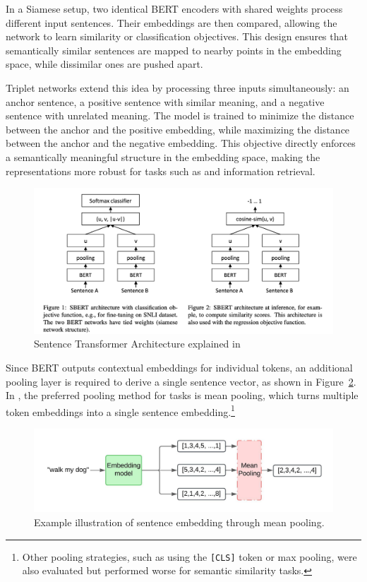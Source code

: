 In a Siamese setup, two identical BERT encoders with shared weights process different input sentences. Their embeddings are then compared, allowing the network to learn similarity or classification objectives. This design ensures that semantically similar sentences are mapped to nearby points in the embedding space, while dissimilar ones are pushed apart.

Triplet networks extend this idea by processing three inputs simultaneously: an anchor sentence, a positive sentence with similar meaning, and a negative sentence with unrelated meaning. The model is trained to minimize the distance between the anchor and the positive embedding, while maximizing the distance between the anchor and the negative embedding. This objective directly enforces a semantically meaningful structure in the embedding space, making the representations more robust for tasks such as  and information retrieval.
\begin{figure}[h!]
    \centering
    \includegraphics[width=1\linewidth]{Images/sentence_transformer.png}
    \caption{Sentence Transformer Architecture explained in\cite{reimers2019sentencebertsentenceembeddingsusing}}
    \label{fig:placeholder}
\end{figure}
Since BERT outputs contextual embeddings for individual tokens, an additional pooling layer is required to derive a single sentence vector, as shown in Figure~\ref{fig:Sentence_embedding}. In \cite{reimers2019sentencebertsentenceembeddingsusing}, the preferred pooling method for  tasks is mean pooling, which turns multiple token embeddings into a single sentence embedding.\footnote{Other pooling strategies, such as using the \texttt{[CLS]} token or max pooling, were also evaluated but performed worse for semantic similarity tasks.}

\begin{figure}[h!]
    \centering
    \includegraphics[width=1\linewidth]{Figures/Sentence_Embedding.jpeg}
    \caption{Example illustration of sentence embedding through mean pooling.}
    \label{fig:Sentence_embedding}
\end{figure}

